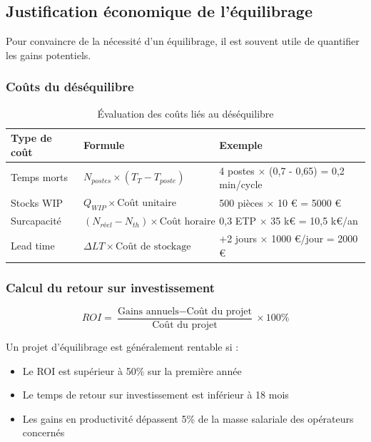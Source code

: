 \documentclass[12pt,a4paper]{article}
\newenvironment{conseil}
  {\begin{tcolorbox}[colback=green!5!white, colframe=green!50!black, title=\textbf{Conseil}]\small}
  {\end{tcolorbox}}
\begin{document}
\subsection{Justification économique de l'équilibrage}

Pour convaincre de la nécessité d'un équilibrage, il est souvent utile de quantifier les gains potentiels.

\subsubsection{Coûts du déséquilibre}

\begin{table}[H]
\centering
\begin{tabular}{|p{4cm}|p{3cm}|p{5cm}|}
\hline
\textbf{Type de coût} & \textbf{Formule} & \textbf{Exemple} \\
\hline
Temps morts & $N_{postes} \times (T_T - T_{poste})$ & 4 postes $\times$ (0,7 - 0,65) = 0,2 min/cycle \\
\hline
Stocks WIP & $Q_{WIP} \times \text{Coût unitaire}$ & 500 pièces $\times$ 10 € = 5000 € \\
\hline
Surcapacité & $(N_{réel} - N_{th}) \times \text{Coût horaire}$ & 0,3 ETP $\times$ 35 k€ = 10,5 k€/an \\
\hline
Lead time & $\Delta LT \times \text{Coût de stockage}$ & +2 jours $\times$ 1000 €/jour = 2000 € \\
\hline
\end{tabular}
\caption{Évaluation des coûts liés au déséquilibre}
\end{table}

\subsubsection{Calcul du retour sur investissement}

\[
\boxed{ROI = \frac{\text{Gains annuels} - \text{Coût du projet}}{\text{Coût du projet}} \times 100\%}
\]

\begin{conseil}
Un projet d'équilibrage est généralement rentable si :
\begin{itemize}
    \item Le ROI est supérieur à 50\% sur la première année
    \item Le temps de retour sur investissement est inférieur à 18 mois
    \item Les gains en productivité dépassent 5\% de la masse salariale des opérateurs concernés
\end{itemize}
\end{conseil}
\end{document}
